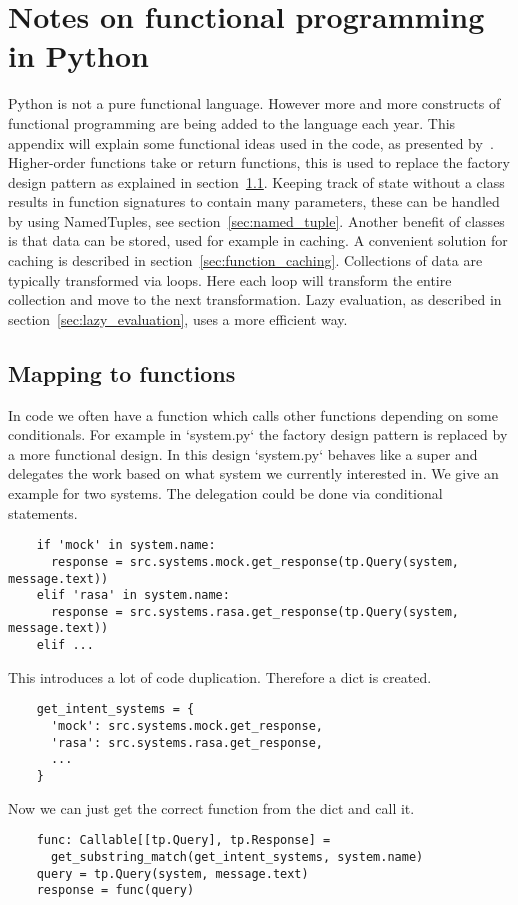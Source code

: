 \chapter{Notes on functional programming in Python}
\label{ch:fp}

Python is not a pure functional language.
However more and more constructs of functional programming are being added to the language each year.
This appendix will explain some functional ideas used in the code, as presented by~\citet{lott2015}.
Higher-order functions take or return functions, this is used to replace the factory design pattern as explained in section~\ref{sec:mapping_to_functions}.
Keeping track of state without a class results in function signatures to contain many parameters, these can be handled by using NamedTuples, see section~\ref{sec:named_tuple}.
Another benefit of classes is that data can be stored, used for example in caching.
A convenient solution for caching is described in section~\ref{sec:function_caching}.
Collections of data are typically transformed via loops.
Here each loop will transform the entire collection and move to the next transformation.
Lazy evaluation, as described in section~\ref{sec:lazy_evaluation}, uses a more efficient way.

\section{Mapping to functions}
\label{sec:mapping_to_functions}
In code we often have a function which calls other functions depending on some conditionals.
For example in `system.py` the factory design pattern is replaced by a more functional design.
In this design `system.py` behaves like a super and delegates the work based on what system
we currently interested in.
We give an example for two systems.
The delegation could be done via conditional statements.

\begin{verbatim}
    if 'mock' in system.name:
      response = src.systems.mock.get_response(tp.Query(system, message.text))
    elif 'rasa' in system.name:
      response = src.systems.rasa.get_response(tp.Query(system, message.text))
    elif ...
\end{verbatim}

This introduces a lot of code duplication.
Therefore a dict is created.
\begin{verbatim}
    get_intent_systems = {
      'mock': src.systems.mock.get_response,
      'rasa': src.systems.rasa.get_response,
      ...
    }
\end{verbatim}
Now we can just get the correct function from the dict and call it.
\begin{verbatim}
    func: Callable[[tp.Query], tp.Response] =
      get_substring_match(get_intent_systems, system.name)
    query = tp.Query(system, message.text)
    response = func(query)
\end{verbatim}

